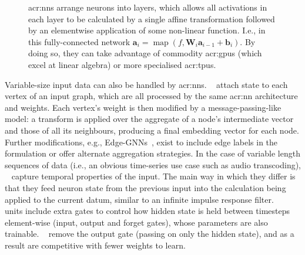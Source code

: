\begin{figure}
	\centering
	\resizebox{0.9\linewidth}{!}{}
	\caption[An example fully-connected neural network.]{\glspl{acr:nn} arrange neurons into layers, which allows all activations in each layer to be calculated by a single affine transformation followed by an elementwise application of some non-linear function. I.e., in this fully-connected network $\mathbf{a}_{i} = \operatorname{map}\left(f, \mathbf{W}_i\mathbf{a}_{i-1} + \mathbf{b}_i\right)$. By doing so, they can take advantage of commodity \glspl{acr:gpu} (which excel at linear algebra) or more specialised \glspl{acr:tpu}.}\label{fig:fcnn}
\end{figure}


Variable-size input data can also be handled by \glspl{acr:nn}.
~\parencite{DBLP:conf/iclr/KipfW17} attach state to each vertex of an input graph, which are all processed by the same \gls{acr:nn} architecture and weights.
Each vertex's weight is then modified by a message-passing-like model: a transform is applied over the aggregate of a node's intermediate vector and those of all its neighbours, producing a final embedding vector for each node.
Further modifications, e.g., Edge-GNNs~\parencite{Mirhoseini2021}, exist to include edge labels in the formulation or offer alternate aggregation strategies.
In the case of variable length sequences of data (i.e., an obvious time-series use case such as audio transcoding), ~\parencite{Rumelhart1986} capture temporal properties of the input.
The main way in which they differ is that they feed neuron state from the previous input into the calculation being applied to the current datum, similar to an infinite impulse response filter.
~\parencite{DBLP:journals/neco/HochreiterS97} units include extra gates to control how hidden state is held between timesteps element-wise (input, output and forget gates), whose parameters are also trainable.
~\parencite{DBLP:conf/emnlp/ChoMGBBSB14} remove the output gate (passing on only the hidden state), and as a result are competitive with fewer weights to learn.

